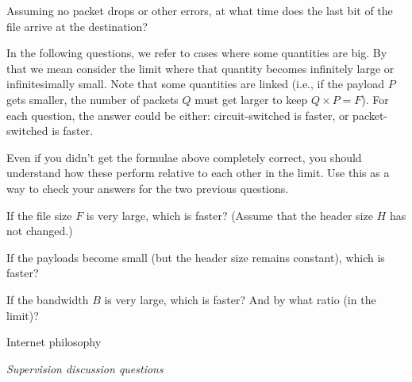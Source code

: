 \documentclass{supervision}
\begin{document}
\begin{questions}
\begin{parts}
\begin{description}
            \begin{subparts}
              \subpart Assuming no packet drops or other errors, at what time
                does the last bit of the file arrive at the destination?
            \end{subparts}

            In the following questions, we refer to cases where some quantities
            are big. By that we mean consider the limit where that quantity
            becomes infinitely large or infinitesimally small. Note that some
            quantities are linked (i.e., if the payload $P$ gets smaller, the
            number of packets $Q$ must get larger to keep $Q \times P = F$).
            For each question, the answer could be either: circuit-switched is
            faster, or packet-switched is faster.

            Even if you didn’t get the formulae above completely correct, you
            should understand how these perform relative to each other in the
            limit. Use this as a way to check your answers for the two previous
            questions.

            \begin{subparts}
              \subpart If the file size $F$ is very large, which is faster?
                (Assume that the header size $H$ has not changed.)

              \subpart If the payloads become small (but the header size
                remains constant), which is faster?

              \subpart If the bandwidth $B$ is very large, which is faster?
                And by what ratio (in the limit)?

            \end{subparts}
          \end{description}
        \end{parts}
      \question Internet philosophy
      \question \textit{Supervision discussion questions}
        \begin{parts}

\end{parts}
\end{questions}
\end{document}
